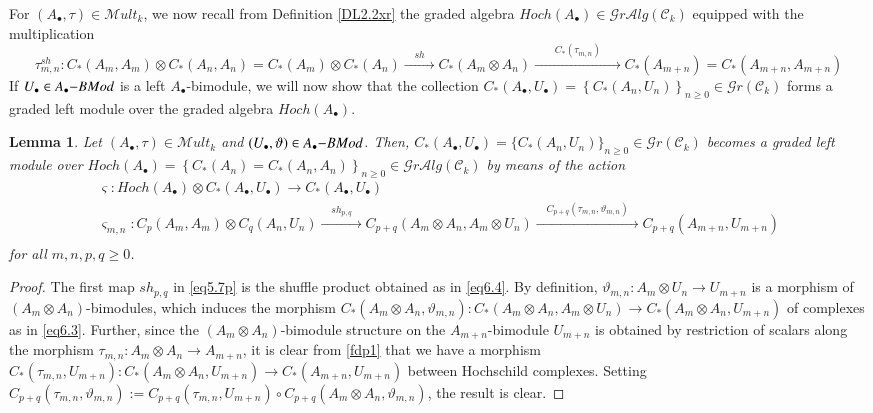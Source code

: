 \documentclass[10pt, colorlinks]{article}
\numberwithin{equation}{section} \DeclareMathSizes{2}{10}{12}{13}
\newtheorem{lem}[thm]{Lemma}
\begin{document}
    \smallskip 
    For $(A_\bullet,\tau)\in \mathscr Mult_k$, we now recall from Definition \ref{DL2.2xr} the graded algebra $Hoch(A_\bullet)\in  \mathscr Gr\mathcal Alg(\mathcal C_k)$ equipped with the multiplication 
\begin{equation}  
\tau_{m,n}^{sh}:C_*(A_m,A_m)\otimes C_*(A_n,A_n)=C_*(A_m)\otimes C_*(A_n)\xrightarrow{\quad sh\quad }C_*(A_m\otimes A_n)\xrightarrow{\qquad C_*(\tau_{m,n})\qquad}C_*(A_{m+n})=C_*(A_{m+n},A_{m+n})
\end{equation} 
    If  $U_\bullet\in A_\bullet{\small{-}}BMod$ is a left $A_\bullet$-bimodule, we will now show that   the collection $C_*(A_\bullet,U_\bullet)=\left\{C_*(A_n,U_n)\right\}_{n\geq 0}\in   \mathscr Gr(\mathcal C_k)$ forms a graded left module over the graded algebra $Hoch(A_\bullet)$.


      
       \begin{lem}\label{L5.12dh}
           Let $(A_\bullet,\tau)\in \mathscr{M}ult_k$ and $(U_\bullet,\vartheta)\in A_\bullet{\small{-}}BMod$. Then, $C_*(A_\bullet,U_\bullet)=\{C_*(A_n,U_n)\}_{n\geq 0}\in  \mathscr Gr(\mathcal C_k)$ becomes a graded left module over $Hoch(A_\bullet)=\left\{C_*(A_n)=C_*(A_n,A_n)\right\}_{n\geq 0}\in   \mathscr Gr\mathcal Alg(\mathcal C_k)$ by means of the action 
           \begin{equation}\label{eq5.7p}
\begin{array}{c}
\varsigma:Hoch(A_\bullet)\otimes  C_*(A_\bullet,U_\bullet)\longrightarrow  C_*(A_\bullet,U_\bullet)\\
               \varsigma_{m,n}:C_p(A_m,A_m)\otimes  C_q(A_n,U_n)\xrightarrow {\quad sh_{p,q}\quad}C_{p+q}(A_m\otimes A_n,A_m\otimes U_n)\xrightarrow{\quad C_{p+q}(\tau_{m,n},\vartheta_{m,n})\quad}  C_{p+q}(A_{m+n},U_{m+n})\\
\end{array}
           \end{equation}
          for all $m,n,p,q\geq 0$. 
       \end{lem}


       
       \begin{proof} The first map $sh_{p,q}$ in \eqref{eq5.7p} is the shuffle product obtained as in \eqref{eq6.4}.  By definition, $\vartheta_{m,n}:A_m\otimes U_n\longrightarrow U_{m+n}$ is a morphism of $(A_{m}\otimes A_n)$-bimodules, which induces the morphism $C_*(A_m\otimes A_n,\vartheta_{m,n}):C_*(A_m\otimes A_n,A_m
\otimes U_n)\longrightarrow C_*(A_m\otimes A_n,U_{m+n})$ of complexes as in \eqref{eq6.3}. Further, since the $(A_{m}\otimes A_n)$-bimodule structure on the $A_{m+n}$-bimodule $U_{m+n}$ is obtained by restriction of scalars along the morphism $\tau_{m,n}:A_m\otimes A_n\longrightarrow A_{m+n}$,  it is clear from \eqref{fdp1} that we have a morphism $C_*(\tau_{m,n},U_{m+n}):C_*(A_m\otimes A_n,U_{m+n})\longrightarrow C_*(A_{m+n},U_{m+n})$ between Hochschild complexes. Setting $C_{p+q}(\tau_{m,n},\vartheta_{m,n}):=C_{p+q}(\tau_{m,n},U_{m+n})\circ C_{p+q}(A_m\otimes A_n,\vartheta_{m,n})$, the result is clear. 

       \end{proof}
\end{document}
